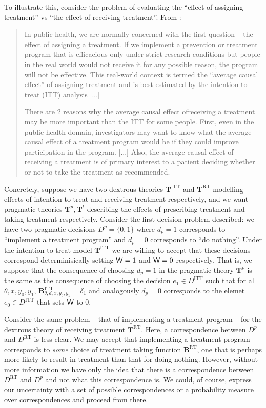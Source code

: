 To illustrate this, consider the problem of evaluating the ``effect of assigning treatment'' vs ``the effect of receiving treatment''. From \citet{shrier_intention--treat_2017}:

\begin{quote}
In public health, we are normally concerned with the first question -- the effect of assigning a treatment. If we implement a prevention or treatment program that is efficacious only under strict research conditions but people in the real world would not receive it for any possible reason, the program will not be effective. This real-world context is termed the “average causal effect” of assigning treatment and is best estimated by the intention-to-treat (ITT) analysis [...]

There are 2 reasons why the average causal effect ofreceiving a treatment may be more important than the ITT for some people. First, even in the public health domain, investigators may want to know what the average causal effect of a treatment program would be if they could improve participation in the program. [...] Also, the average causal effect of receiving a treatment is of primary interest to a patient deciding whether or not to take the treatment as recommended.
\end{quote}

Concretely, suppose we have two dextrous theories $\mathbf{T}^{\mathrm{ITT}}$ and $\mathbf{T}^{\mathrm{RT}}$ modelling effects of intention-to-treat and receiving treatment respectively, and we want pragmatic theories $\mathbf{T}^p,\mathbf{T}^t$ describing the effects of prescribing treatment and taking treatment respectively. Consider the first decision problem described: we have two pragmatic decisions $D^p=\{0,1\}$ where $d_p=1$ corresponds to ``implement a treatment program'' and $d_p=0$ corresponds to ``do nothing''. Under the intention to treat model $\mathbf{T}^{\mathrm{ITT}}$ we are willing to accept that these decisions correspond determinisically setting $\mathsf{W}=1$ and $\mathsf{W}=0$ respectively. That is, we suppose that the consequence of choosing $d_p=1$ in the pragmatic theory $\mathbf{T}^p$ is the same as the consequence of choosing the decision $e_1\in D^{\mathrm{ITT}}$ such that for all $\theta,x,y_0,y_1$, $\mathbf{B}^{\mathrm{ITT}}_{\theta,d,x,y_0,y_1} = \delta_1$ and analogously $d_p=0$ corresponds to the elemet $e_0\in D^{\mathrm{ITT}}$ that sets $\mathsf{W}$ to 0.

Consider the same problem -- that of implementing a treatment program -- for the dextrous theory of receiving treatment $\mathbf{T}^{\mathrm{RT}}$. Here, a correspondence between $D^p$ and $D^{\mathrm{RT}}$ is less clear. We may accept that implementing a treatment program corresponds to \emph{some} choice of treatment taking function $\mathbf{B}^{\mathrm{RT}}$, one that is perhaps more likely to result in treatment than that for doing nothing. However, without more information we have only the idea that there is a correspondence between $D^{\mathrm{RT}}$ and $D^p$ and not what this correspondence is. We could, of course, express our uncertainty with a set of possible correspondences or a probability measure over correspondences and proceed from there.

